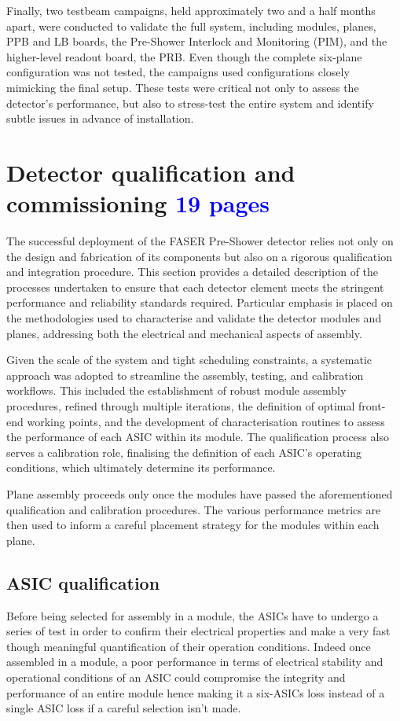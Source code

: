Finally, two testbeam campaigns, held approximately two and a half months apart, were conducted to validate the full system, including modules, planes, PPB and LB boards, the Pre-Shower Interlock and Monitoring (PIM), and the higher-level readout board, the PRB. Even though the complete six-plane configuration was not tested, the campaigns used configurations closely mimicking the final setup. These tests were critical not only to assess the detector's performance, but also to stress-test the entire system and identify subtle issues in advance of installation. 
	
	
	
	
	
	\clearpage
	\section{Detector qualification and commissioning \textcolor{blue}{ 19 pages}}
	The successful deployment of the FASER Pre-Shower detector relies not only on the design and fabrication of its components but also on a rigorous qualification and integration procedure. This section provides a detailed description of the processes undertaken to ensure that each detector element meets the stringent performance and reliability standards required. Particular emphasis is placed on the methodologies used to characterise and validate the detector modules and planes, addressing both the electrical and mechanical aspects of assembly.

	Given the scale of the system and tight scheduling constraints, a systematic approach was adopted to streamline the assembly, testing, and calibration workflows. This included the establishment of robust module assembly procedures, refined through multiple iterations, the definition of optimal front-end working points, and the development of characterisation routines to assess the performance of each ASIC within its module. The qualification process also serves a calibration role, finalising the definition of each ASIC's operating conditions, which ultimately determine its performance.

	Plane assembly proceeds only once the modules have passed the aforementioned qualification and calibration procedures. The various performance metrics are then used to inform a careful placement strategy for the modules within each plane.

	
	
		\subsection{ASIC qualification}
		Before being selected for assembly in a module, the ASICs have to undergo a series of test in order to confirm their electrical properties and make a very fast though meaningful quantification of their operation conditions. Indeed once assembled in a module, a poor performance in terms of electrical stability and operational conditions of an ASIC could compromise the integrity and performance of an entire module hence making it a six-ASICs loss instead of a single ASIC loss if a careful selection isn't made. 
		
